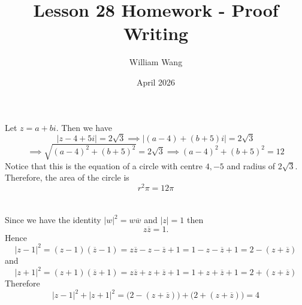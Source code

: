 \documentclass{article}
\title{Lesson 28 Homework - Proof Writing}
\author{William Wang}
\date{April 2026}
\begin{document}
\maketitle

\section{}
Let \(z = a+bi\). Then we have 
\[|z-4+5i| = 2\sqrt{3} \implies |(a-4)+(b+5)i| = 2\sqrt{3}\]
\[\implies \sqrt{(a-4)^2 + (b+5)^2} = 2\sqrt{3} \implies (a-4)^2 + (b+5)^2 = 12\]
Notice that this is the equation of a circle with centre \(4,-5\) and radius of \(2\sqrt{3}\). Therefore, the area of the circle is 
\[r^2\pi = 12\pi\]
\section{}
Since we have the identity \(|w|^2 = w\overline{w}\) and \(|z| = 1\) then
\[
 z\overline{z}=1.
\]
Hence
\[
|z-1|^2 = (z-1)(\overline{z}-1)
= z\overline{z} - z - \overline{z} + 1
= 1 - z - \overline{z} + 1
= 2 - (z+\overline{z})
\]
and
\[
|z+1|^2 = (z+1)(\overline{z}+1)
= z\overline{z} + z + \overline{z} + 1
= 1 + z + \overline{z} + 1
= 2 + (z+\overline{z})
\]
Therefore
\[
|z-1|^2 + |z+1|^2
= \big(2 - (z+\overline{z})\big) + \big(2 + (z+\overline{z})\big)
= 4
\]
\end{document}
